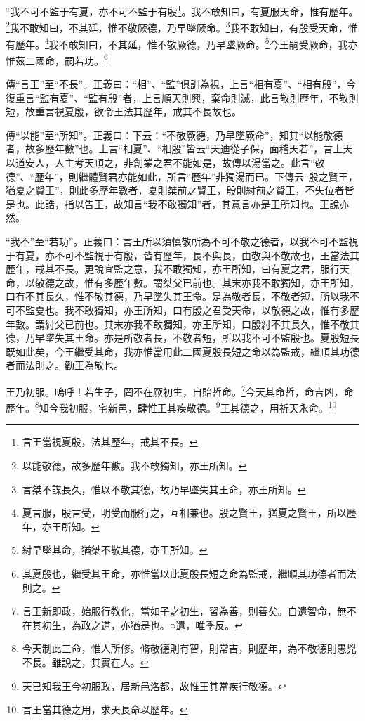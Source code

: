“我不可不監于有夏，亦不可不監于有殷\footnote{言王當視夏殷，法其歷年，戒其不長。}。我不敢知曰，有夏服天命，惟有歷年。\footnote{以能敬德，故多歷年數。我不敢獨知，亦王所知。}我不敢知曰，不其延，惟不敬厥德，乃早墜厥命。\footnote{言桀不謀長久，惟以不敬其德，故乃早墜失其王命，亦王所知。}我不敢知曰，有殷受天命，惟有歷年。\footnote{夏言服，殷言受，明受而服行之，互相兼也。殷之賢王，猶夏之賢王，所以歷年，亦王所知。}我不敢知曰，不其延，惟不敬厥德，乃早墜厥命。\footnote{紂早墜其命，猶桀不敬其德，亦王所知。}今王嗣受厥命，我亦惟茲二國命，嗣若功。\footnote{其夏殷也，繼受其王命，亦惟當以此夏殷長短之命為監戒，繼順其功德者而法則之。}


{\noindent\zhuan{}\fzbyks 傳“言王”至“不長”。正義曰：“相”、“監”俱訓為視，上言“相有夏”、“相有殷”，今復重言“監有夏”、“監有殷”者，上言順天則興，棄命則滅，此言敬則歷年，不敬則短，故重言視夏殷，欲令王法其歷年，戒其不長故也。 \par}

{\noindent\zhuan{}\fzbyks 傳“以能”至“所知”。正義曰：下云：“不敬厥德，乃早墜厥命”，知其“以能敬德者，故多歷年數”也。上言“相夏”、“相殷”皆云“天迪從子保，面稽天若”，言上天以道安人，人主考天順之，非創業之君不能如是，故傳以湯當之。此言“敬德”、“歷年”，則繼體賢君亦能如此，所言“歷年”非獨湯而已。下傳云“殷之賢王，猶夏之賢王”，則此多歷年數者，夏則桀前之賢王，殷則紂前之賢王，不失位者皆是也。此誥，指以告王，故知言“我不敢獨知”者，其意言亦是王所知也。王說亦然。 \par}

{\noindent\shu{}\fzkt “我不”至“若功”。正義曰：言王所以須慎敬所為不可不敬之德者，以我不可不監視于有夏，亦不可不監視于有殷，皆有歷年，長不與長，由敬與不敬故也，王當法其歷年，戒其不長。更說宜監之意，我不敢獨知，亦王所知，曰有夏之君，服行天命，以敬德之故，惟有多歷年數。謂桀父已前也。其末亦我不敢獨知，亦王所知，曰有不其長久，惟不敬其德，乃早墜失其王命。是為敬者長，不敬者短，所以我不可不監夏也。我不敢獨知，亦王所知，曰有殷之君受天命，以敬德之故，惟有多歷年數。謂紂父已前也。其末亦我不敢獨知，亦王所知，曰殷紂不其長久，惟不敬其德，乃早墜失其王命。亦是所敬者長，不敬者短，所以我不可不監殷也。夏殷短長既如此矣，今王繼受其命，我亦惟當用此二國夏殷長短之命以為監戒，繼順其功德者而法則之。勸王為敬也。 \par}

王乃初服。嗚呼！若生子，罔不在厥初生，自貽哲命。\footnote{言王新即政，始服行教化，當如子之初生，習為善，則善矣。自遺智命，無不在其初生，為政之道，亦猶是也。○遺，唯季反。}今天其命哲，命吉凶，命歷年。\footnote{今天制此三命，惟人所修。脩敬德則有智，則常吉，則歷年，為不敬德則愚兇不長。雖說之，其實在人。}知今我初服，宅新邑，肆惟王其疾敬德。\footnote{天已知我王今初服政，居新邑洛都，故惟王其當疾行敬德。}王其德之，用祈天永命。\footnote{言王當其德之用，求天長命以歷年。}


